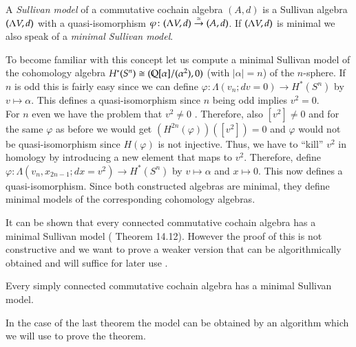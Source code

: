\begin{Definition}
  A \emph{Sullivan model} of a commutative cochain algebra $(A,d)$ is a Sullivan algebra $(\Lambda V,d)$ with a quasi-isomorphism
  $\varphi \colon (\Lambda V,d) \overset{\simeq}{\to} (A,d)$. If $(\Lambda V,d)$ is minimal we also speak of a 
  \emph{minimal Sullivan model}.
\end{Definition}

\begin{Example}
\label{ex:MinimalModelOfSpheres}
 To become familiar with this concept let us compute a minimal Sullivan model of the cohomology 
 algebra $H^*(S^n) \cong (\mathbb{Q} [\alpha] / (\alpha^2), 0)$ (with $|\alpha| = n$) of the
 $n$-sphere. If $n$ is odd this is fairly easy since we can define 
 $\varphi \colon \Lambda (v_n; dv = 0) \to H^*(S^n) $ by $v \mapsto \alpha$. This defines a quasi-isomorphism since $n$ being odd implies
 $ v^2 = 0$. \\
 For $n$ even we have the problem that $v^2 \neq 0$ . Therefore, also 
 $[v^2] \neq 0$ and for the same $\varphi$ as before we would get
 $(H^{2n}(\varphi)) ([v^2]) = 0$ and $\varphi$ would not be quasi-isomorphism since $H(\varphi)$ is not injective.
 Thus, we have to ``kill'' $v^2$
 in homology by introducing a new element that maps to $v^2$. Therefore, define
 $\varphi \colon \Lambda(v_n, x_{2n -1}; dx = v^2) \to H^*(S^n) $ by $v \mapsto \alpha$ and $ x \mapsto 0$.
 This now defines a quasi-isomorphism. Since both constructed algebras are minimal, they define minimal models
 of the corresponding cohomology algebras.
\end{Example}

\begin{Remark}
\label{rem:MinimalSullivanModelsExist}
It can be shown that every connected commutative cochain algebra has a minimal Sullivan model
(\cite{Felix2001} Theorem 14.12). However the proof of this is not constructive and we want to prove a weaker 
version that can be algorithmically obtained and will suffice for later use .
\end{Remark}

\begin{Theorem}
 \label{thm:MinimalSullivanModelsExistForSimplyConnected}
 Every simply connected commutative cochain algebra has a minimal Sullivan model.
\end{Theorem}

In the case of the last theorem the model can be obtained by an algorithm which we will use to prove the theorem.

